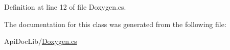 Definition at line 12 of file Doxygen.\+cs.



The documentation for this class was generated from the following file\+:\begin{DoxyCompactItemize}
\item 
Api\+Doc\+Lib/\hyperlink{_doxygen_8cs}{Doxygen.\+cs}\end{DoxyCompactItemize}
